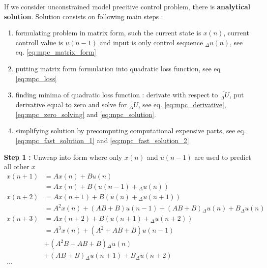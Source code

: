 \documentclass[12pt,twoside,onecolumn,openany,extrafontsizes,dvipsnames]{memoir}
\begin{document}
        If we consider unconstrained model precitive control problem, there is \textbf{analytical solution}.
        Solution consists on following main steps : 
        \begin{enumerate}
            \item formulating problem in matrix form, such the current state is $x(n)$, 
            current controll value is $u(n-1)$ and input is only control sequence ${_\Delta u}(n)$, see eq. \ref{eq:mpc_matrix_form} 
            \item putting matrix form formulation into quadratic loss function, see eq \ref{eq:mpc_loss}
            \item finding minima of quadratic loss function : derivate with respect to $\tilde{_\Delta U}$, 
            put derivative equal to zero and solve for $\tilde{_\Delta U}$, see eq. \ref{eq:mpc_derivative}, \ref{eq:mpc_zero_solving} and \ref{eq:mpc_solution}.
            \item simplifying solution by precomputing computational expensive parts, see eq. \ref{eq:mpc_fast_solution_1} and \ref{eq:mpc_fast_solution_2}
        \end{enumerate}

        \textbf{Step 1 : } Unwrap into form where only $x(n)$ and $u(n-1)$ are used to predict all other $x$
        \begin{align}
            x(n+1)&= Ax(n) + Bu(n) \\
                &= Ax(n) + B(u(n-1) + {_\Delta u(n)}) \nonumber \\
            x(n+2)&= Ax(n+1) + B(u(n) + {_\Delta u(n+1)}) \nonumber \\
                &= A^2x(n) + (AB + B)u(n-1) + (AB+B) {_\Delta u(n)} + B {_\Delta u(n)} \nonumber \\
            x(n+3)&= Ax(n+2) + B(u(n+1) + {_\Delta u(n+2)}) \nonumber \\
                &= A^3x(n) + (A^2 + AB + B)u(n-1) \nonumber \\
                & + (A^2B + AB + B) {_\Delta u(n)} \nonumber \\
                & + (AB + B) {_\Delta u(n+1)} + B {_\Delta u(n+2)} \nonumber \\
            ... \nonumber
        \end{align}  
\end{document}
